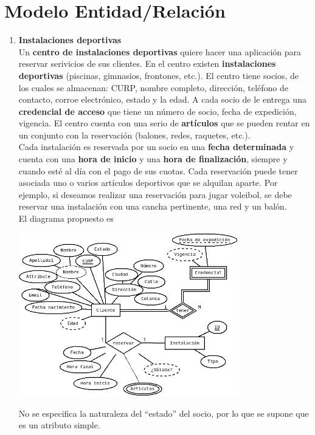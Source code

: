 \documentclass{article}
\begin{document}
    \section{Modelo Entidad/Relación}
    \begin{enumerate}[label = (\alph*)]
        \item {
            \textbf{Instalaciones deportivas} \\
            Un \textbf{centro de instalaciones deportivas} quiere hacer una
            aplicación para reservar serivicios de sus clientes. En el centro
            existen \textbf{instalaciones deportivas} (piscinas, gimnasios, 
            frontones, etc.). El centro tiene socios, de los cuales se 
            almacenan: CURP, nombre completo, dirección, teléfono de contacto,
            corroe electrónico, estado y la edad. A cada socio de le entrega 
            una \textbf{credencial de acceso} que tiene un número de socio, 
            fecha de expedición, vigencia. El centro cuenta con una serio de 
            \textbf{artículos} que se pueden rentar en un conjunto con la 
            reservación (balones, redes, raquetes, etc.). \\
            Cada instalación es reservada por un socio en una 
            \textbf{fecha determinada} y cuenta con una \textbf{hora de inicio}
            y una \textbf{hora de finalización}, siempre y cuando esté al 
            día con el pago de sus cuotas. Cada reservación puede tener 
            asociada uno o varios artículos deportivos que se alquilan aparte.
            Por ejemplo, si deseamos realizar una reservación para jugar 
            voleibol, se debe reservar una instalación con una cancha
            pertinente, una red y un balón. \\
            El diagrama propuesto es 
            \begin{center}
                \includegraphics[width=0.75\textwidth]{deportes-er.png}
            \end{center}  
            No se especifica la naturaleza del ``estado'' del socio, por lo que
            se supone que es un atributo simple.
 
}
\end{enumerate}
\end{document}
